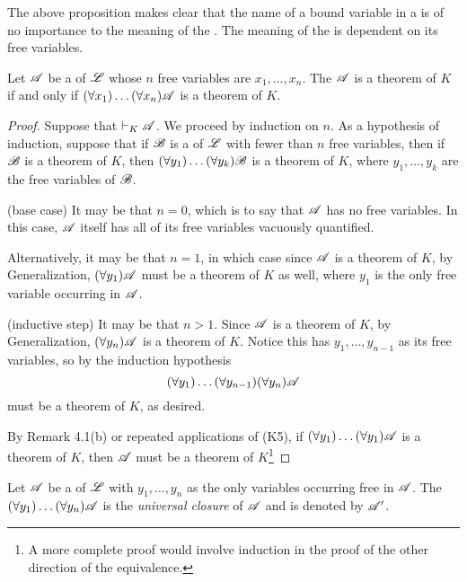   The above proposition makes clear that the name of a bound variable in a \wf{} is of no importance to the meaning of the \wf{}. The meaning of the \wf{} is dependent on its free variables.

  \begin{proposition}
    Let \(\mathscr{A}\) be a \wf{} of \(\mathscr{L}\) whose \(n\) free variables are \(x_1, \dots, x_n\). The \wf{} \(\mathscr{A}\) is a theorem of \(K\) if and only if \((\forall x_1) \dots (\forall x_n) \mathscr{A}\) is a theorem of \(K\).

    \begin{proof}
      \Ra{} Suppose that \(\vdash_{K}\mathscr{A}\). We proceed by induction on \(n\). As a hypothesis of induction, suppose that if \(\mathscr{B}\) is a \wf{} of \(\mathscr{L}\) with fewer than \(n\) free variables, then if \(\mathscr{B}\) is a theorem of \(K\), then \((\forall y_1)\dots(\forall y_k)\mathscr{B}\) is a theorem of \(K\), where \(y_1, \dots, y_k\) are the free variables of \(\mathscr{B}\).

      (base case) It may be that \(n = 0\), which is to say that \(\mathscr{A}\) has no free variables. In this case, \(\mathscr{A}\) itself has all of its free variables vacuously quantified.

      Alternatively, it may be that \(n = 1\), in which case since \(\mathscr{A}\) is a theorem of \(K\), by Generalization, \((\forall y_1)\mathscr{A}\) must be a theorem of \(K\) as well, where \(y_1\) is the only free variable occurring in \(\mathscr{A}\).

      (inductive step) It may be that \(n > 1\). Since \(\mathscr{A}\) is a theorem of \(K\), by Generalization, \((\forall y_n)\mathscr{A}\) is a theorem of \(K\). Notice this \wf{} has \(y_1, \dots, y_{n-1}\) as its free variables, so by the induction hypothesis
        \[(\forall y_1)\dots(\forall y_{n-1})(\forall y_n)\mathscr{A}\]
      must be a theorem of \(K\), as desired.

    \La{} By Remark 4.1(b) or repeated applications of (K5), if \((\forall y_1)\dots(\forall y_1)\mathscr{A}\) is a theorem of \(K\), then \(\mathscr{A}\) must be a theorem of \(K\)\footnote{A more complete proof would involve induction in the proof of the other direction of the equivalence.}
  \end{proof}
\end{proposition}

\begin{definition}
  Let \(\mathscr{A}\) be a \wf{} of \(\mathscr{L}\) with \(y_1, \dots, y_n\) as the only variables occurring free in \(\mathscr{A}\). The \wf{} \((\forall y_1)\dots(\forall y_n)\mathscr{A}\) is the \textit{universal closure} of \(\mathscr{A}\) and is denoted by \(\mathscr{A}'\).
\end{definition}

